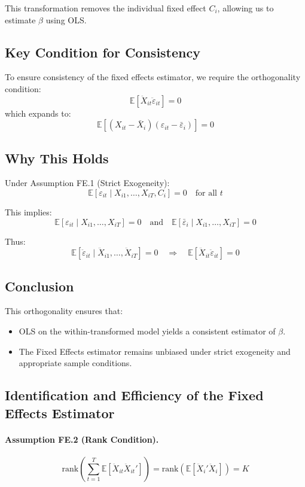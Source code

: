 \documentclass[12pt, oneside]{article}
\begin{document}
This transformation removes the individual fixed effect \( C_i \), allowing us to estimate \( \beta \) using OLS.

\subsection*{Key Condition for Consistency}

To ensure consistency of the fixed effects estimator, we require the orthogonality condition:
\[
\mathbb{E}[\ddot{X}_{it} \ddot{\varepsilon}_{it}] = 0
\]
which expands to:
\[
\mathbb{E}[(X_{it} - \bar{X}_i)(\varepsilon_{it} - \bar{\varepsilon}_i)] = 0
\]

\subsection*{Why This Holds}

Under Assumption FE.1 (Strict Exogeneity):
\[
\mathbb{E}[\varepsilon_{it} \mid X_{i1}, \dots, X_{iT}, C_i] = 0 \quad \text{for all } t
\]

This implies:
\[
\mathbb{E}[\varepsilon_{it} \mid X_{i1}, \dots, X_{iT}] = 0
\quad \text{and} \quad
\mathbb{E}[\bar{\varepsilon}_i \mid X_{i1}, \dots, X_{iT}] = 0
\]

Thus:
\[
\mathbb{E}[\ddot{\varepsilon}_{it} \mid \ddot{X}_{i1}, \dots, \ddot{X}_{iT}] = 0
\quad \Rightarrow \quad
\mathbb{E}[\ddot{X}_{it} \ddot{\varepsilon}_{it}] = 0
\]

\subsection*{Conclusion}

This orthogonality ensures that:
\begin{itemize}
    \item OLS on the within-transformed model yields a consistent estimator of \( \beta \).
    \item The Fixed Effects estimator remains unbiased under strict exogeneity and appropriate sample conditions.
\end{itemize}
\subsection*{Identification and Efficiency of the Fixed Effects Estimator}

\paragraph{Assumption FE.2 (Rank Condition).}
\[
\text{rank} \left( \sum_{t=1}^T \mathbb{E}[\ddot{X}_{it} \ddot{X}_{it}'] \right) = \text{rank} \left( \mathbb{E}[\ddot{X}_i' \ddot{X}_i] \right) = K
\]
\end{document}
